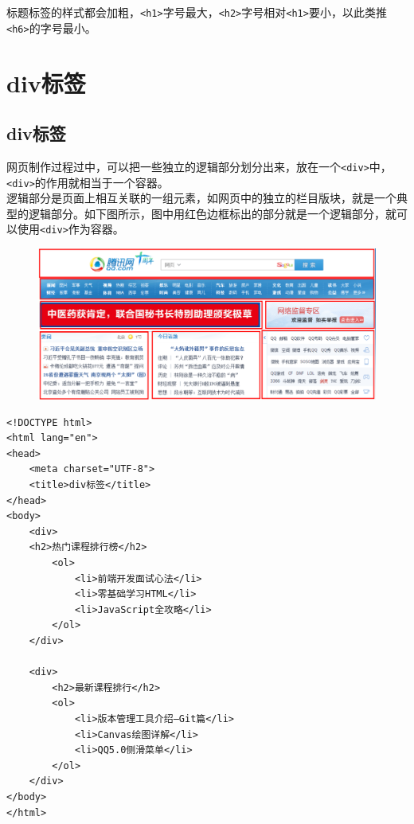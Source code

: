 标题标签的样式都会加粗，\lstinline|<h1>|字号最大，\lstinline|<h2>|字号相对\lstinline|<h1>|要小，以此类推\lstinline|<h6>|的字号最小。

\newpage

\section{div标签}

\subsection{div标签}

网页制作过程过中，可以把一些独立的逻辑部分划分出来，放在一个\lstinline|<div>|中，\lstinline|<div>|的作用就相当于一个容器。 \\

逻辑部分是页面上相互关联的一组元素，如网页中的独立的栏目版块，就是一个典型的逻辑部分。如下图所示，图中用红色边框标出的部分就是一个逻辑部分，就可以使用\lstinline|<div>|作为容器。 \\

\begin{figure}[H]
	\centering
	\includegraphics[scale=0.5]{img/C2/2-3/1.png}
\end{figure}

\begin{lstlisting}[style=htmlcssjs, title=div标签]
<!DOCTYPE html>
<html lang="en">
<head>
    <meta charset="UTF-8">
    <title>div标签</title>
</head>
<body>
    <div>
    <h2>热门课程排行榜</h2>
        <ol>
            <li>前端开发面试心法</li>
            <li>零基础学习HTML</li>
            <li>JavaScript全攻略</li>
        </ol>
    </div>

    <div>
        <h2>最新课程排行</h2>
        <ol>
            <li>版本管理工具介绍—Git篇</li>
            <li>Canvas绘图详解</li>
            <li>QQ5.0侧滑菜单</li>
        </ol>
    </div>
</body>
</html>
\end{lstlisting}

